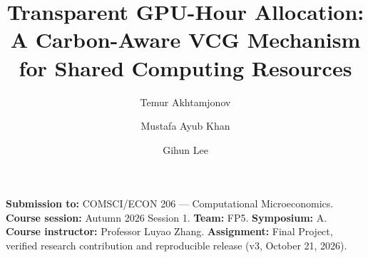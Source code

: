 \documentclass[sigconf,nonacm]{acmart}
\title{Transparent GPU-Hour Allocation: A Carbon-Aware VCG Mechanism for Shared Computing Resources}
\author{Temur Akhtamjonov}
\affiliation{\institution{Duke Kunshan University}\city{Kunshan}\country{China}}
\author{Mustafa Ayub Khan}
\affiliation{\institution{Duke Kunshan University}\city{Kunshan}\country{China}}
\author{Gihun Lee}
\affiliation{\institution{Duke Kunshan University}\city{Kunshan}\country{China}}
\newcommand{\CourseNumber}{COMSCI/ECON 206}
\newcommand{\CourseName}{Computational Microeconomics}
\newcommand{\CourseSession}{Autumn 2026 Session 1}
\newcommand{\Instructor}{Professor Luyao Zhang}
\newcommand{\TeamCode}{FP5}
\newcommand{\SymposiumSession}{A}
\newcommand{\coursemeta}{\noindent\textbf{Submission to:} \CourseNumber{} --- \CourseName.\\
\textbf{Course session:} \CourseSession. \textbf{Team:} \TeamCode. \textbf{Symposium:} \SymposiumSession.\\
\textbf{Course instructor:} \Instructor. \textbf{Assignment:} Final Project, verified research contribution and reproducible release (v3, October 21, 2026).\par\smallskip}
\begin{document}
\begin{teaserfigure}
\captionsetup{skip=8pt}
\centering

\caption{Carbon-aware GPU-hour allocation: questions, model, exact computation, truthfulness conditions C1 + C2 and payment-feasibility check C3 (orange), and merit map: inherited (blue), new (orange), evidence (green). One synthetic instance.}
\label{fig:teaser}
\end{teaserfigure}
\maketitle\raggedbottom\coursemeta




\end{document}
